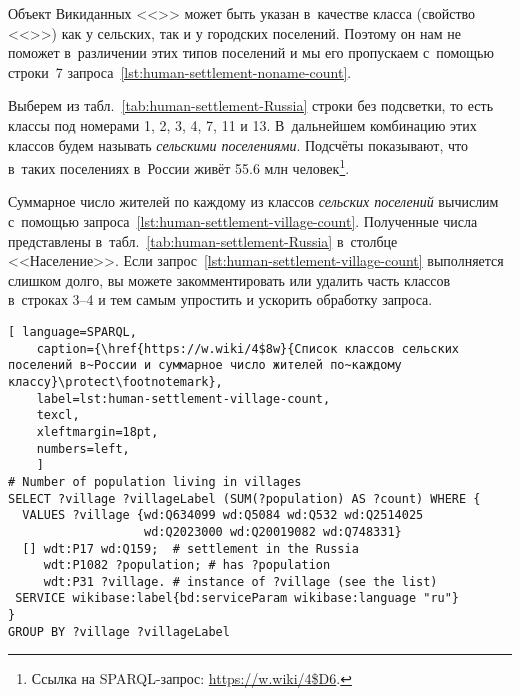 Объект Викиданных <<>> 
может быть указан в~качестве класса (свойство <<>>) 
как у сельских, так и у городских поселений. 
Поэтому он нам не поможет в~различении этих типов поселений 
и мы его пропускаем с~помощью строки~7 запроса~\ref{lst:human-settlement-noname-count}.



\newpage
Выберем из табл.~\ref{tab:human-settlement-Russia} строки без подсветки, 
то есть классы под номерами 1, 2, 3, 4, 7, 11 и 13. 
В~дальнейшем комбинацию этих классов будем называть \emph{сельскими поселениями}. 
Подсчёты показывают, что в~таких поселениях в~России живёт 
\num{55,6} млн человек\footnote{%
Ссылка на SPARQL-запрос: \url{https://w.wiki/4$D6}.%
}. 

Суммарное число жителей по каждому из классов \emph{сельских поселений} 
вычислим с~помощью запроса~\ref{lst:human-settlement-village-count}. 
Полученные числа представлены в~табл.~\ref{tab:human-settlement-Russia} в~столбце <<Население>>. 
Если запрос~\ref{lst:human-settlement-village-count} выполняется слишком долго, 
вы можете закомментировать или удалить часть классов в~строках 3--4 
и тем самым упростить и ускорить обработку запроса. 

\begin{lstlisting}[ language=SPARQL, 
    caption={\href{https://w.wiki/4$8w}{Список классов сельских поселений в~России и суммарное число жителей по~каждому классу}\protect\footnotemark},
    label=lst:human-settlement-village-count,
    texcl,
    xleftmargin=18pt, 
    numbers=left,
    ]
# Number of population living in villages
SELECT ?village ?villageLabel (SUM(?population) AS ?count) WHERE {  
  VALUES ?village {wd:Q634099 wd:Q5084 wd:Q532 wd:Q2514025 
                   wd:Q2023000 wd:Q20019082 wd:Q748331}
  [] wdt:P17 wd:Q159;  # settlement in the Russia
     wdt:P1082 ?population; # has ?population
     wdt:P31 ?village. # instance of ?village (see the list)
 SERVICE wikibase:label{bd:serviceParam wikibase:language "ru"}
}
GROUP BY ?village ?villageLabel
\end{lstlisting}%



